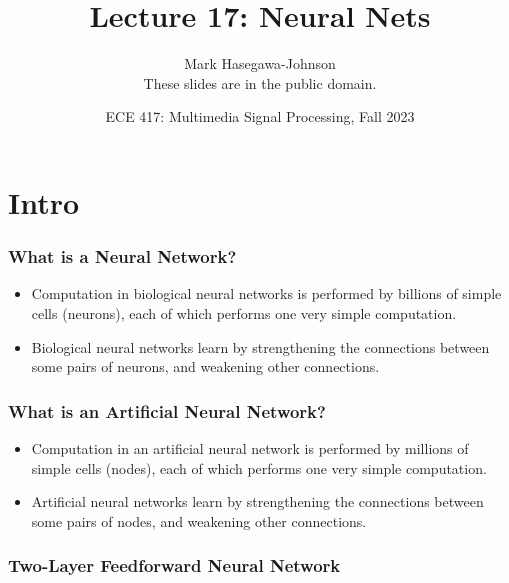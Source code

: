 \documentclass{beamer}
\title{Lecture 17: Neural Nets}
\author{Mark Hasegawa-Johnson\\These slides are in the public domain.}
\date{ECE 417: Multimedia Signal Processing, Fall 2023}
\begin{document}
\begin{frame}
  \maketitle
\end{frame}

\begin{frame}
  \tableofcontents
\end{frame}


\section{Intro}
\setcounter{subsection}{1}
\begin{frame}
  \frametitle{What is a Neural Network?}
  \begin{itemize}
  \item Computation in biological neural networks is performed by
    billions of simple cells (neurons), each of which performs one
    very simple computation.
  \item Biological neural networks learn by strengthening  the connections
    between some pairs of neurons, and weakening other connections.
  \end{itemize}
\end{frame}

\begin{frame}
  \frametitle{What is an Artificial Neural Network?}
  \begin{itemize}
  \item Computation in an artificial neural network is performed by
    millions of simple cells (nodes), each of which performs one
    very simple computation.
  \item Artificial neural networks learn by strengthening  the connections
    between some pairs of nodes, and weakening other connections.
  \end{itemize}
\end{frame}

\begin{frame}
  \frametitle{Two-Layer Feedforward Neural Network}
  \begin{small}\end{small}
\end{frame}
\end{document}
